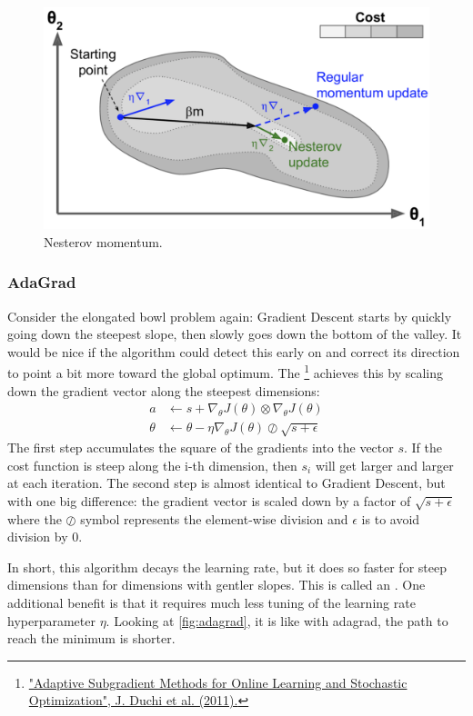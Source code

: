 \begin{figure}
\centering
\includegraphics[scale=0.5]{img/nesterov}
\caption{Nesterov momentum.}
\end{figure}
\subsubsection{AdaGrad}
Consider the elongated bowl problem again: Gradient Descent starts by quickly going down the steepest slope, then slowly goes down the bottom of the valley. It would be nice if the algorithm could detect this early on and correct its direction to point a bit more toward the global optimum. The \footnote{\href{https://homl.info/56}{"Adaptive Subgradient Methods for Online Learning and Stochastic Optimization", J. Duchi et al. (2011).}} achieves this by scaling down the gradient vector along the steepest dimensions:
\begin{equation}
\begin{aligned}
a &\leftarrow s + \nabla_\theta J(\theta) \otimes \nabla_\theta J(\theta)\\
\theta &\leftarrow \theta - \eta  \nabla_\theta J(\theta) \oslash \sqrt{s+\epsilon}
\end{aligned}
\end{equation}
The first step accumulates the square of the gradients into the vector $s$. If the cost function is steep along the i-th dimension, then $s_i$ will get larger and larger at each iteration. The second step is almost identical to Gradient Descent, but with one big difference: the gradient vector is scaled down by a factor of $\sqrt{s+\epsilon}$ where the $\oslash$ symbol represents the element-wise division and $\epsilon$ is to avoid division by $0$.

In short, this algorithm decays the learning rate, but it does so faster for steep dimensions than for dimensions with gentler slopes. This is called an . One additional benefit is that it requires much less tuning of the learning rate hyperparameter $\eta$. Looking at \autoref{fig:adagrad}, it is like with adagrad, the path to reach the minimum is shorter.

